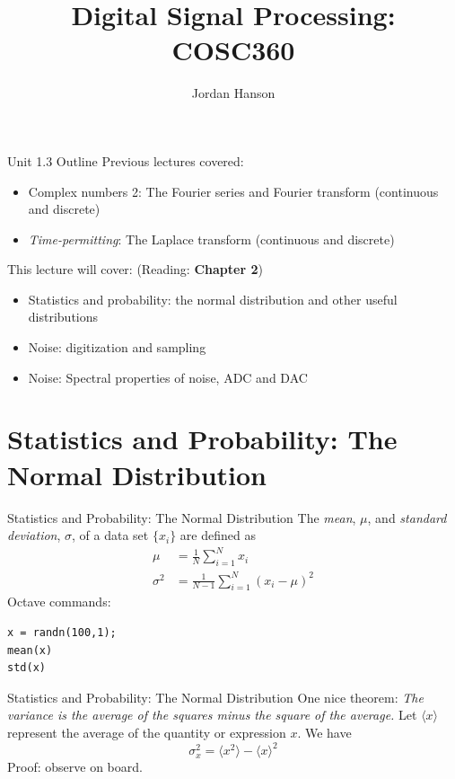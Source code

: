 \documentclass{beamer}
\title{Digital Signal Processing: COSC360}
\author{Jordan Hanson}
\institute{Whittier College Department of Physics and Astronomy}
\begin{document}
\maketitle

\begin{frame}{Unit 1.3 Outline}
Previous lectures covered:
\begin{itemize}
\item Complex numbers 2: The Fourier series and Fourier transform (continuous and discrete)
\item \textit{Time-permitting}: The Laplace transform (continuous and discrete)
\end{itemize}
This lecture will cover: (Reading: \textbf{Chapter 2})
\begin{itemize}
\item \alert{Statistics and probability: the normal distribution and other useful distributions}
\item \alert{Noise: digitization and sampling}
\item Noise: Spectral properties of noise, ADC and DAC
\end{itemize}
\end{frame}

\section{Statistics and Probability: The Normal Distribution}

\begin{frame}[fragile]{Statistics and Probability: The Normal Distribution}
The \textit{mean}, $\mu$, and \textit{standard deviation}, $\sigma$, of a data set $\lbrace x_i \rbrace$ are defined as
\begin{align}
\mu &= \frac{1}{N}\sum_{i=1}^N x_i \\
\sigma^2 &= \frac{1}{N-1}\sum_{i=1}^N\left(x_i-\mu\right)^2
\end{align}
Octave commands:
\begin{verbatim}
x = randn(100,1);
mean(x)
std(x)
\end{verbatim}
\end{frame}

\begin{frame}[fragile]{Statistics and Probability: The Normal Distribution}
One nice theorem: \textit{The variance is the average of the squares minus the square of the average.}  Let $\langle x \rangle$ represent the average of the quantity or expression $x$.  We have
\begin{equation}
\sigma_x^2 = \langle x^2 \rangle - \langle x \rangle^2
\end{equation}
Proof: observe on board.
\end{frame}
\end{document}

